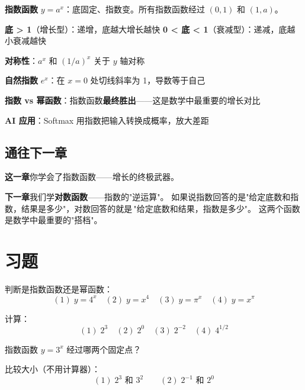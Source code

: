\begin{progressbox}
\textbf{指数函数} \(y = a^x\)：底固定、指数变。所有指数函数经过 \((0,1)\) 和 \((1,a)\)。

\textbf{底 > 1}（增长型）：递增，底越大增长越快
\textbf{0 < 底 < 1}（衰减型）：递减，底越小衰减越快

\textbf{对称性}：\(a^x\) 和 \((1/a)^x\) 关于 \(y\) 轴对称

\textbf{自然指数} \(e^x\)：在 \(x=0\) 处切线斜率为 1，导数等于自己

\textbf{指数 vs 幂函数}：指数函数\textbf{最终胜出}——这是数学中最重要的增长对比

\textbf{AI 应用}：Softmax 用指数把输入转换成概率，放大差距
\end{progressbox}

\subsection*{通往下一章}

\textbf{这一章}你学会了指数函数——增长的终极武器。

\textbf{下一章}我们学\textbf{对数函数}——指数的"逆运算"。
如果说指数回答的是"给定底数和指数，结果是多少"，对数回答的就是\,"给定底数和结果，指数是多少"。
这两个函数是数学中最重要的"搭档"。


\section{习题}


\begin{exercise}[0]
判断是指数函数还是幂函数：
\[
(1)\; y = 4^x \quad (2)\; y = x^4 \quad (3)\; y = \pi^x \quad (4)\; y = x^{\pi}
\]
\end{exercise}

\begin{exercise}[0]
计算：
\[
(1)\; 2^3 \quad (2)\; 2^0 \quad (3)\; 2^{-2} \quad (4)\; 4^{1/2}
\]
\end{exercise}

\begin{exercise}[0]
指数函数 \(y = 3^x\) 经过哪两个固定点？
\end{exercise}

\begin{exercise}[0]
比较大小（不用计算器）：
\[
(1)\; 2^3 \text{ 和 } 3^2 \qquad
(2)\; 2^{-1} \text{ 和 } 2^0
\]
\end{exercise}

